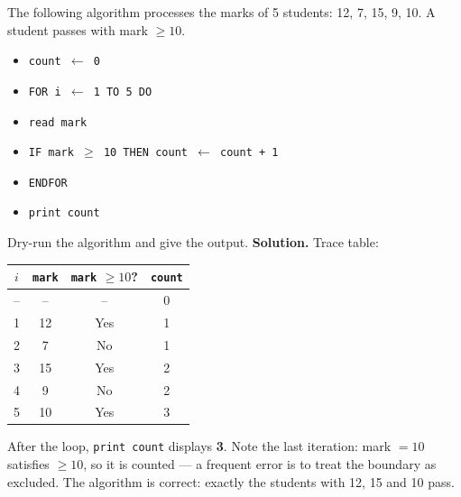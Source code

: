 \documentclass[11pt]{article}
\begin{document}
\begin{exoresolu}
The following algorithm processes the marks of 5 students: 12, 7, 15, 9, 10. A student passes with mark $\geq 10$.
\begin{itemize}
\item[] \texttt{count $\leftarrow$ 0}
\item[] \texttt{FOR i $\leftarrow$ 1 TO 5 DO}
\item[] \texttt{\quad read mark}
\item[] \texttt{\quad IF mark $\geq$ 10 THEN count $\leftarrow$ count + 1}
\item[] \texttt{ENDFOR}
\item[] \texttt{print count}
\end{itemize}
Dry-run the algorithm and give the output.
\tcblower
\textbf{Solution.} Trace table:

\begin{center}
\begin{tabular}{|c|c|c|c|}
\hline
\rowcolor{popblueL} $i$ & \texttt{mark} & \texttt{mark} $\geq 10$? & \texttt{count} \\
\hline
-- & -- & -- & 0 \\
\hline
1 & 12 & Yes & 1 \\
\hline
2 & 7 & No & 1 \\
\hline
3 & 15 & Yes & 2 \\
\hline
4 & 9 & No & 2 \\
\hline
5 & 10 & Yes & 3 \\
\hline
\end{tabular}
\end{center}

After the loop, \texttt{print count} displays \textbf{3}. Note the last iteration: mark $=10$ satisfies $\geq 10$, so it is counted — a frequent error is to treat the boundary as excluded. The algorithm is correct: exactly the students with 12, 15 and 10 pass.
\end{exoresolu}
\end{document}
